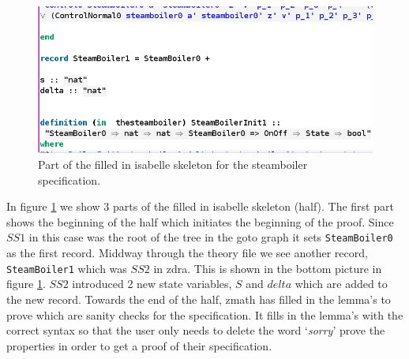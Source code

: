 \begin{figure}[H]
\begin{minipage}{0.53\textwidth}
\end{minipage}\hfill\hfill
\includegraphics[scale=0.4]{Figures/Evaluation/5imageb.png}
\caption{Part of the filled in isabelle skeleton for the steamboiler specification.\label{fig:filledinsteamskeleton}}
\end{figure}

In figure \ref{fig:filledinsteamskeleton} we show 3 parts of the filled in isabelle skeleton (\gls{half}). The first part shows the beginning of the \gls{half} which initiates the beginning of the proof. Since $SS1$ in this case was the root of the tree in the goto graph it sets \verb|SteamBoiler0| as the first record. Middway through the theory file we see another record, \verb|SteamBoiler1| which was $SS2$ in \gls{zdra}. This is shown in the bottom picture in figure \ref{fig:filledinsteamskeleton}. $SS2$ introduced 2 new state variables, $S$ and $delta$ which are added to the new record. Towards the end of the \gls{half}, \gls{zmath} has filled in the lemma's to prove which are sanity checks for the specification. It fills in the lemma's with the correct syntax so that the user only needs to delete the word `\emph{sorry}' prove the properties in order to get a proof of their specification. 

